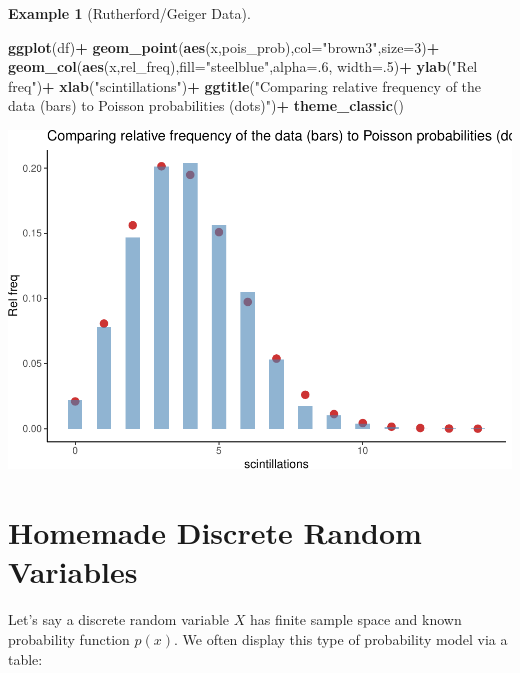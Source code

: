 \documentclass[
]{book}
\newenvironment{Shaded}{\begin{snugshade}}{\end{snugshade}}
\newcommand{\AttributeTok}[1]{\textcolor[rgb]{0.13,0.29,0.53}{#1}}
\newcommand{\DecValTok}[1]{\textcolor[rgb]{0.00,0.00,0.81}{#1}}
\newcommand{\FunctionTok}[1]{\textcolor[rgb]{0.13,0.29,0.53}{\textbf{#1}}}
\newcommand{\NormalTok}[1]{#1}
\newcommand{\SpecialCharTok}[1]{\textcolor[rgb]{0.81,0.36,0.00}{\textbf{#1}}}
\newcommand{\StringTok}[1]{\textcolor[rgb]{0.31,0.60,0.02}{#1}}
\theoremstyle{definition}
\theoremstyle{definition}
\newtheorem{example}{Example}[chapter]
\theoremstyle{definition}
\theoremstyle{definition}
\theoremstyle{remark}
\begin{document}
\begin{example}[Rutherford/Geiger Data]
\begin{Shaded}
\begin{Highlighting}[]
\FunctionTok{ggplot}\NormalTok{(df)}\SpecialCharTok{+}
  \FunctionTok{geom\_point}\NormalTok{(}\FunctionTok{aes}\NormalTok{(x,pois\_prob),}\AttributeTok{col=}\StringTok{"brown3"}\NormalTok{,}\AttributeTok{size=}\DecValTok{3}\NormalTok{)}\SpecialCharTok{+}
  \FunctionTok{geom\_col}\NormalTok{(}\FunctionTok{aes}\NormalTok{(x,rel\_freq),}\AttributeTok{fill=}\StringTok{"steelblue"}\NormalTok{,}\AttributeTok{alpha=}\NormalTok{.}\DecValTok{6}\NormalTok{, }\AttributeTok{width=}\NormalTok{.}\DecValTok{5}\NormalTok{)}\SpecialCharTok{+}
  \FunctionTok{ylab}\NormalTok{(}\StringTok{"Rel freq"}\NormalTok{)}\SpecialCharTok{+}
  \FunctionTok{xlab}\NormalTok{(}\StringTok{"scintillations"}\NormalTok{)}\SpecialCharTok{+}
  \FunctionTok{ggtitle}\NormalTok{(}\StringTok{"Comparing relative frequency of the data (bars) to Poisson probabilities (dots)"}\NormalTok{)}\SpecialCharTok{+}
  \FunctionTok{theme\_classic}\NormalTok{()}
\end{Highlighting}
\end{Shaded}

\includegraphics{math340-notes_files/figure-latex/unnamed-chunk-155-1.pdf}

\end{example}

\section{Homemade Discrete Random Variables}\label{custom-discrete-R}

Let's say a discrete random variable \(X\) has finite sample space and known probability function \(p(x)\). We often display this type of probability model via a table:
\end{document}
